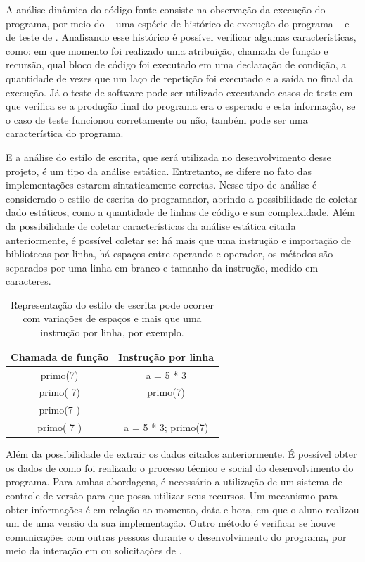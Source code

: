 			A análise dinâmica do código-fonte consiste na observação da execução do
			programa, por meio do  -- uma espécie de histórico de execução
			do programa -- e de teste de . Analisando esse histórico é
			possível verificar algumas características, como: em que momento foi realizado
			uma atribuição, chamada de função e recursão, qual bloco de código foi
			executado em uma declaração de condição, a quantidade de vezes que um laço
			de repetição foi executado e a saída no final da execução. Já o teste de
			software pode ser utilizado executando casos de teste em que verifica se a
			produção final do programa era o esperado e esta informação, se o caso de
			teste funcionou corretamente ou não, também pode ser uma característica do programa.
			
			E a análise do estilo de escrita, que será utilizada no desenvolvimento desse projeto,
			é um tipo da análise estática. Entretanto, se difere no fato das implementações estarem
			sintaticamente corretas. Nesse tipo de análise é considerado o estilo de escrita do
			programador, abrindo a possibilidade de coletar dado estáticos, como a quantidade de
			linhas de código e sua complexidade. Além da possibilidade de coletar
			características da análise estática citada anteriormente, é possível coletar se:
			há mais que uma instrução e importação de bibliotecas por linha, há espaços entre
			operando e operador, os métodos são separados por uma linha em branco e tamanho
			da instrução, medido em caracteres.
			
			\begin{table}
				\centering
				\begin{tabular}{|c|c|}
					\hline
					Chamada de função & Instrução por linha \\ \hline
					primo(7)          & a = 5 * 3  \\
					primo( 7)         & primo(7)     \\
					primo(7 )         &      \\
					primo( 7 )        & a = 5 * 3; primo(7)    \\
					\hline
				\end{tabular}
				\captionsetup{justification=centering}
				\caption[Representação do estilo de escrita]{Representação do estilo
				de escrita pode ocorrer com variações de espaços e mais que uma
				instrução por linha, por exemplo.}
			\end{table}
			
			Além da possibilidade de extrair os dados citados anteriormente. É possível
			obter os dados de como foi realizado o processo técnico e social do desenvolvimento
			do programa. Para ambas abordagens, é necessário a utilização de um sistema de
			controle de versão para que possa utilizar seus recursos. Um mecanismo para
			obter informações é em relação ao momento, data e hora, em que o aluno realizou
			um  de uma versão da sua implementação. Outro método é verificar
			se houve comunicações com outras pessoas durante o desenvolvimento do programa,
			por meio da interação em  ou solicitações de .
			
